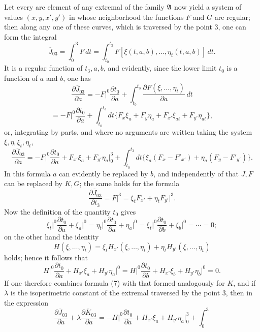 \documentclass[11pt,a4paper,leqno]{article}
\begin{document}
Let every arc element of any extremal of the family $\mathfrak{A}$ now yield a system of values $(x,y,x',y')$ in whose neighborhood the functions $F$ and $G$ are regular; then along any one of these curves, which is traversed by the point 3, one can form the integral
\[
\overline{J}_{03}=\int_0^3F\,dt=
\int_{t_0}^{t_3}F[\xi(t,a,b),\ldots,\eta_t(t,a,b)]\,dt.
\]
It is a regular function of $t_3,a,b$, and evidently, since the lower limit $t_0$ is a function of $a$ and $b$, one has
\[
\frac{\partial\overline{J}_{03}}{\partial a}
=-F\bigg|^0\frac{\partial t_0}{\partial a}+
\int_{t_0}^{t_3}\frac{\partial F(\xi,\ldots,\eta_t)}{\partial a}\,dt
\]
\[
=-F\bigg|^0\frac{\partial t_0}{\partial a}+
\int_{t_0}^{t_3}dt\{F_x\xi_a+F_y\eta_a+F_{x'}\xi_{at}+F_{y'}\eta_{at}\},
\]
or, integrating by parts, and where no arguments are written taking the system $\xi,\eta,\xi_t,\eta_t$,
\begin{equation}\tag{7}
\frac{\partial\overline{J}_{03}}{\partial a}
=-F\bigg|^0\frac{\partial t_0}{\partial a}+
F_{x'}\xi_a+F_{y'}\eta_a\bigg|_0^3+
\int_{t_0}^{t_3}dt\{\xi_a(F_x-F'_{x'})+\eta_a(F_y-F'_{y'})\}.
\end{equation}
In this formula $a$ can evidently be replaced by $b$, and independently of that $J,F$ can be replaced by $K,G$; the same holds for the formula
\begin{equation}\tag{8}
\frac{\partial\overline{J}_{03}}{\partial t_3}=F\bigg|^3=\xi_tF_{x'}+\eta_tF_{y'}\bigg|^3.
\end{equation}
Now the definition of the quantity $t_0$ gives
\[
\xi_t\bigg|^0\frac{\partial t_0}{\partial a}+\xi_a\bigg|^0
=\eta_t\bigg|^0\frac{\partial t_0}{\partial a}+\eta_a\bigg|^0
=\xi_t\bigg|^0\frac{\partial t_0}{\partial b}+\xi_b\bigg|^0=\cdots=0;
\]
on the other hand the identity
\[
H(\xi,\ldots,\eta_t)=\xi_tH_{x'}(\xi,\ldots,\eta_t)+\eta_tH_{y'}(\xi,\ldots,\eta_t)
\]
holds; hence it follows that
\begin{equation}\tag{9}
H\bigg|^0\frac{\partial t_0}{\partial a}+H_{x'}\xi_a+H_{y'}\eta_a\bigg|^0
=H\bigg|^0\frac{\partial t_0}{\partial b}+H_{x'}\xi_b+H_{y'}\eta_b\bigg|^0=0.
\end{equation}
If one therefore combines formula (7) with that formed analogously for $K$, and if $\lambda$ is the isoperimetric constant of the extremal traversed by the point 3, then in the expression
\[
\frac{\partial\overline{J}_{03}}{\partial a}+\lambda\frac{\partial\overline{K}_{03}}{\partial a}
=-H\bigg|^0\frac{\partial t_0}{\partial a}+H_{x'}\xi_a+H_{y'}\eta_a\bigg|_0^3+\int_0^3
\]
\end{document}
